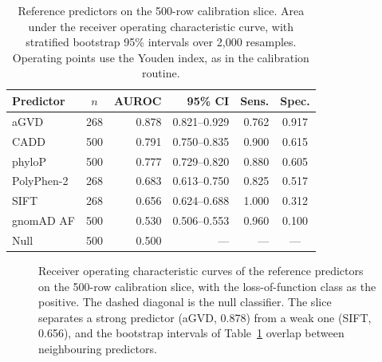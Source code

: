 \documentclass[10pt,journal]{IEEEtran}
\begin{document}
\begin{table}[!t]
\caption{Reference predictors on the 500-row calibration slice. Area under the receiver operating characteristic curve, with stratified bootstrap 95\% intervals over 2{,}000 resamples. Operating points use the Youden index, as in the calibration routine.}
\label{tab:baselines}
\centering
\footnotesize
\begin{tabular}{@{}lcrrrc@{}}
\toprule
Predictor & $n$ & AUROC & 95\% CI & Sens. & Spec. \\
\midrule
aGVD & 268 & 0.878 & 0.821--0.929 & 0.762 & 0.917 \\
CADD & 500 & 0.791 & 0.750--0.835 & 0.900 & 0.615 \\
phyloP & 500 & 0.777 & 0.729--0.820 & 0.880 & 0.605 \\
PolyPhen-2 & 268 & 0.683 & 0.613--0.750 & 0.825 & 0.517 \\
SIFT & 268 & 0.656 & 0.624--0.688 & 1.000 & 0.312 \\
gnomAD AF & 500 & 0.530 & 0.506--0.553 & 0.960 & 0.100 \\
\midrule
Null & 500 & 0.500 & --- & --- & --- \\
\bottomrule
\end{tabular}
\end{table}

\begin{figure}[!t]
\centering
{}
\caption{Receiver operating characteristic curves of the reference predictors on the 500-row calibration slice, with the loss-of-function class as the positive. The dashed diagonal is the null classifier. The slice separates a strong predictor (aGVD, 0.878) from a weak one (SIFT, 0.656), and the bootstrap intervals of Table~\ref{tab:baselines} overlap between neighbouring predictors.}
\label{fig:roc}
\end{figure}
\end{document}
